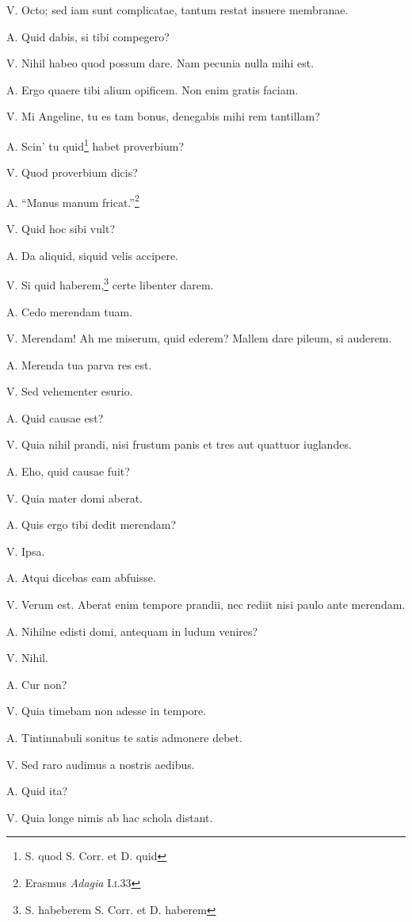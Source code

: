 \documentclass{article}
\begin{document}
V. Octo; sed iam sunt complicatae, tantum restat insuere membranae. 

A. Quid dabis, si tibi compegero?

V. Nihil habeo quod possum dare. Nam pecunia nulla mihi est. 

A. Ergo quaere tibi alium opificem. Non enim gratis faciam. 

V. Mi Angeline, tu es tam bonus, denegabis mihi rem tantillam?

A. Scin' tu quid\footnote{S. quod S. Corr. et D. quid} habet proverbium?

V. Quod proverbium dicis?

A. ``Manus manum fricat.''\footnote{Erasmus \emph{Adagia} I.\textsc{i}.33}

V. Quid hoc sibi vult?

A. Da aliquid, siquid velis accipere. 

V. Si quid haberem,\footnote{S. habeberem S. Corr. et D. haberem} certe libenter darem. 

A. Cedo merendam tuam. 

V. Merendam! Ah me miserum, quid ederem? Mallem dare pileum, si auderem. 

A. Merenda tua parva res est. 

V. Sed vehementer esurio. 

A. Quid causae est?

V. Quia nihil prandi, nisi frustum panis et tres aut quattuor iuglandes. 

A. Eho, quid causae fuit?

V. Quia mater domi aberat. 

A. Quis ergo tibi dedit merendam?

V. Ipsa. 

A. Atqui dicebas eam abfuisse. 

V. Verum est. Aberat enim tempore prandii, nec rediit nisi paulo ante merendam. 

A. Nihilne edisti domi, antequam in ludum venires?

V. Nihil. 

A. Cur non?

V. Quia timebam non adesse in tempore. 

A. Tintinnabuli sonitus te satis admonere debet. 

V. Sed raro audimus a nostris aedibus. 

A. Quid ita?

V. Quia longe nimis ab hac schola distant. 
\end{document}
